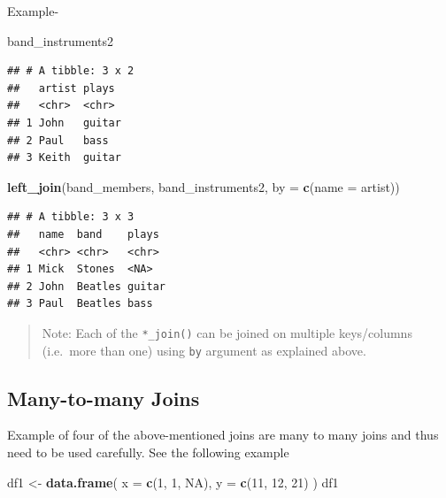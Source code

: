 \documentclass[
]{book}
\newenvironment{Shaded}{\begin{snugshade}}{\end{snugshade}}
\newcommand{\AttributeTok}[1]{\textcolor[rgb]{0.13,0.29,0.53}{#1}}
\newcommand{\ConstantTok}[1]{\textcolor[rgb]{0.56,0.35,0.01}{#1}}
\newcommand{\DecValTok}[1]{\textcolor[rgb]{0.00,0.00,0.81}{#1}}
\newcommand{\FunctionTok}[1]{\textcolor[rgb]{0.13,0.29,0.53}{\textbf{#1}}}
\newcommand{\NormalTok}[1]{#1}
\newcommand{\OtherTok}[1]{\textcolor[rgb]{0.56,0.35,0.01}{#1}}
\newcommand{\StringTok}[1]{\textcolor[rgb]{0.31,0.60,0.02}{#1}}
\begin{document}
Example-

\begin{Shaded}
\begin{Highlighting}[]
\NormalTok{band\_instruments2}
\end{Highlighting}
\end{Shaded}

\begin{verbatim}
## # A tibble: 3 x 2
##   artist plays 
##   <chr>  <chr> 
## 1 John   guitar
## 2 Paul   bass  
## 3 Keith  guitar
\end{verbatim}

\begin{Shaded}
\begin{Highlighting}[]
\FunctionTok{left\_join}\NormalTok{(band\_members, band\_instruments2, }\AttributeTok{by =} \FunctionTok{c}\NormalTok{(}\StringTok{\textquotesingle{}name\textquotesingle{}} \OtherTok{=} \StringTok{\textquotesingle{}artist\textquotesingle{}}\NormalTok{))}
\end{Highlighting}
\end{Shaded}

\begin{verbatim}
## # A tibble: 3 x 3
##   name  band    plays 
##   <chr> <chr>   <chr> 
## 1 Mick  Stones  <NA>  
## 2 John  Beatles guitar
## 3 Paul  Beatles bass
\end{verbatim}

\begin{quote}
Note: Each of the \texttt{*\_join()} can be joined on multiple keys/columns (i.e.~more than one) using \texttt{by} argument as explained above.
\end{quote}

\hypertarget{many-to-many-joins}{%
\subsection*{Many-to-many Joins}\label{many-to-many-joins}}

Example of four of the above-mentioned joins are many to many joins and thus need to be used carefully. See the following example

\begin{Shaded}
\begin{Highlighting}[]
\NormalTok{df1 }\OtherTok{\textless{}{-}} \FunctionTok{data.frame}\NormalTok{(}
  \AttributeTok{x =} \FunctionTok{c}\NormalTok{(}\DecValTok{1}\NormalTok{, }\DecValTok{1}\NormalTok{, }\ConstantTok{NA}\NormalTok{),}
  \AttributeTok{y =} \FunctionTok{c}\NormalTok{(}\DecValTok{11}\NormalTok{, }\DecValTok{12}\NormalTok{, }\DecValTok{21}\NormalTok{)}
\NormalTok{)}
\NormalTok{df1}
\end{Highlighting}
\end{Shaded}
\end{document}
